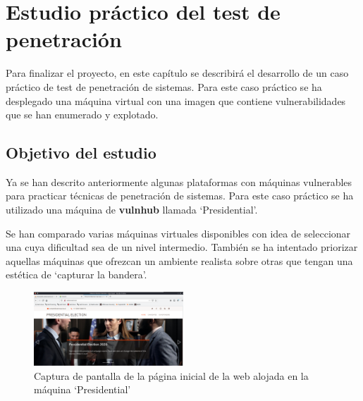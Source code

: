 \chapter{Estudio práctico del test de penetración}

Para finalizar el proyecto, en este capítulo se describirá el desarrollo de un caso práctico de test de penetración de sistemas. Para este caso práctico se ha desplegado una máquina virtual con una imagen que contiene vulnerabilidades que se han enumerado y explotado. 

\section{Objetivo del estudio}

Ya se han descrito anteriormente algunas plataformas con máquinas vulnerables para practicar técnicas de penetración de sistemas. Para este caso práctico se ha utilizado una máquina de \textbf{vulnhub} llamada `Presidential'.

Se han comparado varias máquinas virtuales disponibles con idea de seleccionar una cuya dificultad sea de un nivel intermedio. También se ha intentado priorizar aquellas máquinas que ofrezcan un ambiente realista sobre otras que tengan una estética de `capturar la bandera'. 


\begin{figure}[!hbt]
  \centering
  \includegraphics[width=0.5\textwidth]{imagenes/presidentialweb.png}
  \caption{Captura de pantalla de la página inicial de la web alojada en la máquina `Presidential'}
   \label{presidentialweb}
\end{figure}



